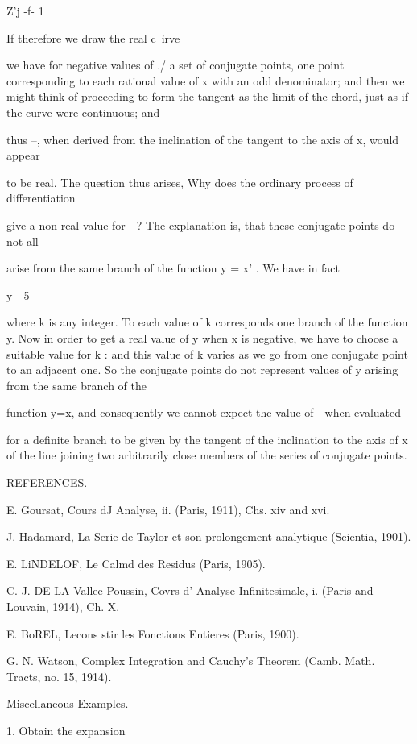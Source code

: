 {{{{Z'j -f- 1

If therefore we draw the real c\ irve

we have for negative values of ./ a set of conjugate points, one point
corresponding to each rational value of x with an odd denominator;
and then we might think of proceeding to form the tangent as the limit
of the chord, just as if the curve were continuous; and

thus --, when derived from the inclination of the tangent to the axis
of x, would appear

to be real. The question thus arises, Why does the ordinary process of
differentiation

give a non-real value for - ? The explanation is, that these conjugate
points do not all

arise from the same branch of the function y = x' . We have in fact

y - 5

where k is any integer. To each value of k corresponds one branch of
the function y. Now in order to get a real value of y when x is
negative, we have to choose a suitable value for k : and this value of
k varies as we go from one conjugate point to an adjacent one. So the
conjugate points do not represent values of y arising from the same
branch of the

function y=x, and consequently we cannot expect the value of - when
evaluated

for a definite branch to be given by the tangent of the inclination to
the axis of x of the line joining two arbitrarily close members of the
series of conjugate points.

%
%

REFERENCES.

E. Goursat, Cours dJ Analyse, ii. (Paris, 1911), Chs. xiv and xvi.

J. Hadamard, La Serie de Taylor et son prolongement analytique
(Scientia, 1901).

E. LiNDELOF, Le Calmd des Residus (Paris, 1905).

C. J. DE LA Vallee Poussin, Covrs d' Analyse Infinitesimale, i. (Paris
and Louvain, 1914), Ch. X.

E. BoREL, Lecons stir les Fonctions Entieres (Paris, 1900).

G. N. Watson, Complex Integration and Cauchy's Theorem (Camb. Math.
Tracts, no. 15, 1914).

Miscellaneous Examples.

1. Obtain the expansion

}}}}
